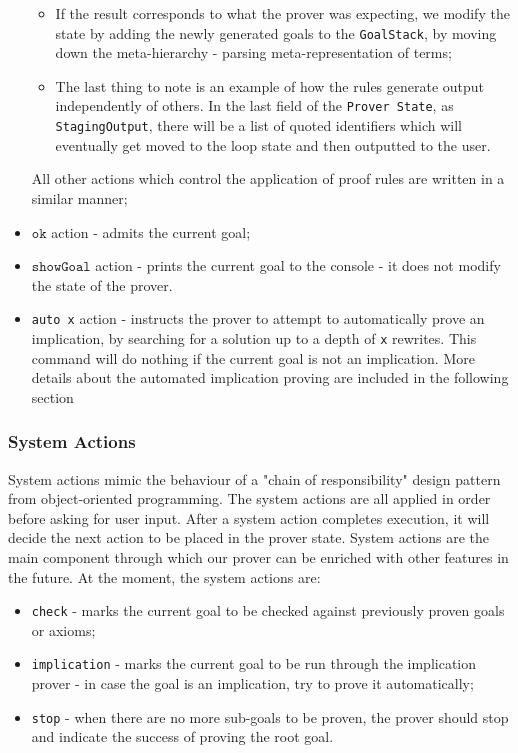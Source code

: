 \documentclass[12pt,a4paper]{article}
\begin{document}
\begin{itemize}
\begin{itemize}
			\item If the result corresponds to what the prover was expecting, we modify the state by adding the newly generated goals to the \texttt{GoalStack}, by moving down the meta-hierarchy - parsing meta-representation of terms;
			\item The last thing to note is an example of how the rules generate output independently of others. In the last field of the \texttt{Prover State}, as \texttt{StagingOutput}, there will be a list of quoted identifiers which will eventually get moved to the loop state and then outputted to the user.
		\end{itemize}
		All other actions which control the application of proof rules are written in a similar manner;
	\item {\(\mathtt{ok}\) action - admits the current goal;}
	\item {\(\mathtt{showGoal}\) action - prints the current goal to the console - it does not modify the state of the prover.}
	\item {\texttt{auto x}} action - instructs the prover to attempt to automatically prove an implication, by searching for a solution up to a depth of \texttt{x} rewrites. This command will do nothing if the current goal is not an implication. More details about the automated implication proving are included in the following section
\end{itemize}
\subsubsection{System Actions}
System actions mimic the behaviour of a "chain of responsibility" design pattern from object-oriented programming. The system actions are all applied in order before asking for user input. After a system action completes execution, it will decide the next action to be placed in the prover state. System actions are the main component through which our prover can be enriched with other features in the future. At the moment, the system actions are:
\begin{itemize}
	\item {\texttt{check}} - marks the current goal to be checked against previously proven goals or axioms;
	\item {\texttt{implication}} - marks the current goal to be run through the implication prover - in case the goal is an implication, try to prove it automatically;
	\item {\texttt{stop}} - when there are no more sub-goals to be proven, the prover should stop and indicate the success of proving the root goal.
\end{itemize}
\end{document}
